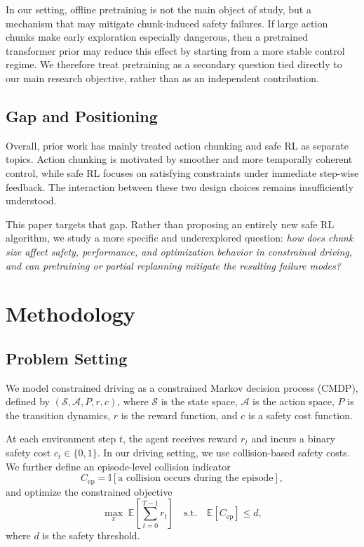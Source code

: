 \documentclass{article}
\begin{document}
In our setting, offline pretraining is not the main object of study, but a mechanism that may mitigate chunk-induced safety failures. If large action chunks make early exploration especially dangerous, then a pretrained transformer prior may reduce this effect by starting from a more stable control regime. We therefore treat pretraining as a secondary question tied directly to our main research objective, rather than as an independent contribution.

\subsection{Gap and Positioning}

Overall, prior work has mainly treated action chunking and safe RL as separate topics. Action chunking is motivated by smoother and more temporally coherent control, while safe RL focuses on satisfying constraints under immediate step-wise feedback. The interaction between these two design choices remains insufficiently understood.

This paper targets that gap. Rather than proposing an entirely new safe RL algorithm, we study a more specific and underexplored question: \emph{how does chunk size affect safety, performance, and optimization behavior in constrained driving, and can pretraining or partial replanning mitigate the resulting failure modes?}

\section{Methodology}

\subsection{Problem Setting}

We model constrained driving as a constrained Markov decision process (CMDP), defined by $(\mathcal{S}, \mathcal{A}, P, r, c)$, where $\mathcal{S}$ is the state space, $\mathcal{A}$ is the action space, $P$ is the transition dynamics, $r$ is the reward function, and $c$ is a safety cost function.

At each environment step $t$, the agent receives reward $r_t$ and incurs a binary safety cost $c_t \in \{0,1\}$. In our driving setting, we use collision-based safety costs. We further define an episode-level collision indicator
\begin{equation}
C_{\mathrm{ep}} = \mathbb{I}[\text{a collision occurs during the episode}],
\end{equation}
and optimize the constrained objective
\begin{equation}
\max_{\pi} \; \mathbb{E}\left[\sum_{t=0}^{T-1} r_t\right]
\quad
\text{s.t.}
\quad
\mathbb{E}[C_{\mathrm{ep}}] \le d,
\end{equation}
where $d$ is the safety threshold.
\end{document}
